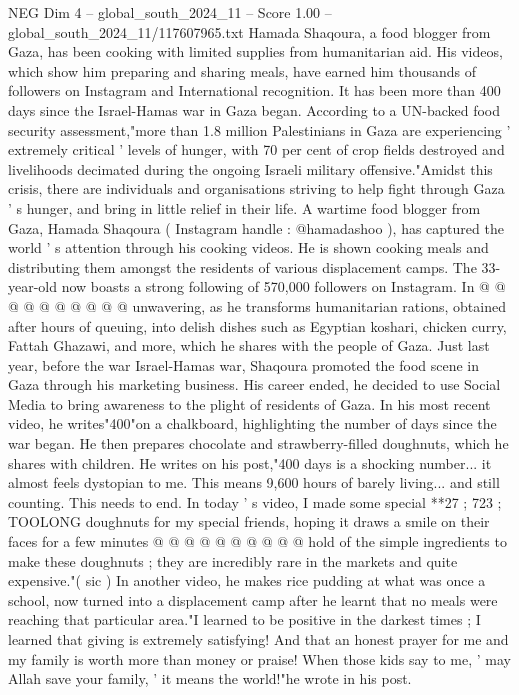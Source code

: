 \begin{textsample}{NEG Dim 4 – global\_south\_2024\_11 – Score 1.00 – global\_south\_2024\_11/117607965.txt}  \label{ex:f4_neg_179}
Hamada Shaqoura, a food blogger from Gaza, has been cooking with limited supplies from humanitarian aid.
His videos, which show him preparing and sharing meals, have earned him thousands of followers on Instagram and International recognition.
It has been more than 400 days since the Israel-Hamas war in Gaza began.
According to a UN-backed food security assessment,"more than 1.8 million Palestinians in Gaza are experiencing ' extremely critical ' levels of hunger, with 70 per cent of crop fields destroyed and livelihoods decimated during the ongoing Israeli military offensive."Amidst this crisis, there are individuals and organisations striving to help fight through Gaza ' s hunger, and bring in little relief in their life.
A wartime food blogger from Gaza, Hamada Shaqoura ( Instagram handle : @hamadashoo ), has captured the world ' s attention through his cooking videos.
He is shown cooking meals and distributing them amongst the residents of various displacement camps.
The 33-year-old now boasts a strong following of 570,000 followers on Instagram.
In @ @ @ @ @ @ @ @ @ @ unwavering, as he transforms humanitarian rations, obtained after hours of queuing, into delish dishes such as Egyptian koshari, chicken curry, Fattah Ghazawi, and more, which he shares with the people of Gaza.
Just last year, before the war Israel-Hamas war, Shaqoura promoted the food scene in Gaza through his marketing business.
His career ended, he decided to use Social Media to bring awareness to the plight of residents of Gaza.
In his most recent video, he writes"400"on a chalkboard, highlighting the number of days since the war began.
He then prepares chocolate and strawberry-filled doughnuts, which he shares with children.
He writes on his post,"400 days is a shocking number... it almost feels dystopian to me.
This means 9,600 hours of barely living... and still counting.
This needs to end.
In today ' s video, I made some special **27 ; 723 ; TOOLONG doughnuts for my special friends, hoping it draws a smile on their faces for a few minutes @ @ @ @ @ @ @ @ @ @ hold of the simple ingredients to make these doughnuts ; they are incredibly rare in the markets and quite expensive."( sic ) In another video, he makes rice pudding at what was once a school, now turned into a displacement camp after he learnt that no meals were reaching that particular area."I learned to be positive in the darkest times ; I learned that giving is extremely satisfying!
And that an honest prayer for me and my family is worth more than money or praise!
When those kids say to me, ' may Allah save your family, ' it means the world!"he wrote in his post.

\end{textsample}
